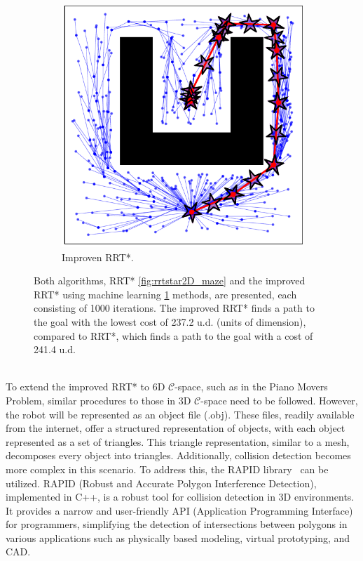\documentclass{ctuthesis}
\begin{document}
\begin{figure}[!ht]
\begin{subfigure}[b]{0.45\textwidth}
      \includegraphics[width=\textwidth]{figChap4/RRTstar2DML_maze237.2.pdf}
      \caption{Improven RRT*.}
      \label{fig:rrtstarML2D_maze}
  \end{subfigure}
  \caption{Both algorithms, 
  RRT* \ref{fig:rrtstar2D_maze} and the improved RRT* using 
  machine learning \ref{fig:rrtstarML2D_maze} methods, 
  are presented, each consisting of 1000 iterations. 
  The improved RRT* finds a path to the goal with 
  the lowest cost of 237.2 u.d. (units of dimension), compared to RRT*, 
  which finds a path to the goal with a cost of 241.4 u.d.}
  \label{fig:RRTstar2D_vs_RRTstarML2D}
\end{figure}
\\[12pt]
To extend the improved RRT* to 6D $\mathcal{C}$-space, 
such as in the Piano Movers Problem, similar procedures to those in 3D $\mathcal{C}$-space 
need to be followed. 
However, the robot will be represented as an object file (.obj). 
These files, readily available from the internet, 
offer a structured representation of objects, 
with each object represented as a set of triangles. 
This triangle representation, similar to a mesh, 
decomposes every object into triangles. 
Additionally, collision detection becomes more complex in this scenario. 
To address this, the RAPID library~\cite{gottschalk1997rapid} can be utilized. 
RAPID (Robust and Accurate Polygon Interference Detection), implemented in C++, 
is a robust tool for collision detection in 3D environments. 
It provides a narrow and user-friendly API (Application Programming Interface) for programmers, 
simplifying the detection of intersections between polygons in various applications such as 
physically based modeling, virtual prototyping, and CAD.
\end{document}
